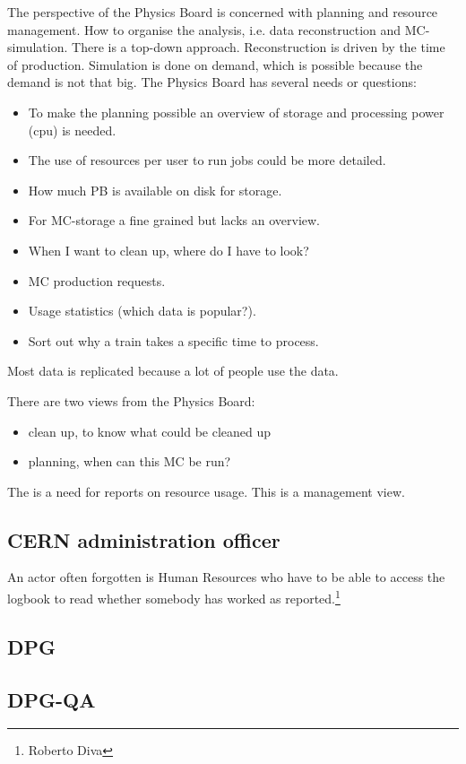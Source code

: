 The perspective of the Physics Board is concerned with planning and resource management. How to organise the analysis, i.e. data reconstruction and MC-simulation. There is a top-down approach. Reconstruction is driven by the time of production. Simulation is done on demand, which is possible because the demand is not that big. The Physics Board has several needs or questions:
\begin{itemize}
  \item To make the planning possible an overview of storage and processing power (cpu) is needed. 
  \item The use of resources per user to run jobs could be more detailed.
  \item How much PB is available on disk for storage.
  \item For MC-storage a fine grained but lacks an overview.
  \item When I want to clean up, where do I have to look?
  \item MC production requests.
  \item Usage statistics (which data is popular?).
  \item Sort out why a train takes a specific time to process.
\end{itemize}
Most data is replicated because a lot of people use the data.

There are two views from the Physics Board:
\begin{itemize}
  \item clean up, to know what could be cleaned up
  \item planning, when can this MC be run?
\end{itemize}
The is a need for reports on resource usage. This is a management view.






\subsection{CERN administration officer}
An actor often forgotten is Human Resources who have to be able to access the logbook to read whether somebody has worked as reported.\footnote{Roberto Diva}



\subsection{DPG}

\subsection{DPG-QA}

